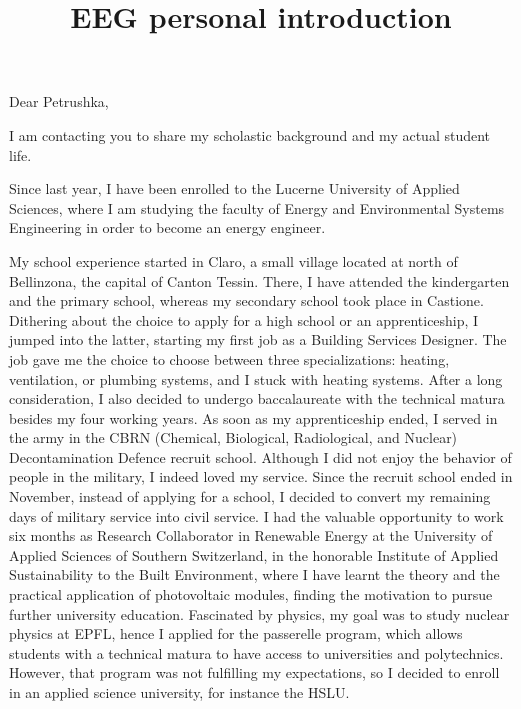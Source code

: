 \documentclass{article}
\title{\textbf{EEG personal introduction}}
\date{}
\begin{document}
\maketitle
\vspace*{-1.5cm}

Dear Petrushka,
\setlength{\parskip}{1.5em}

I am contacting you to share my scholastic background and my actual student life.
\setlength{\parskip}{.3em}

Since last year, I have been enrolled to the Lucerne University of Applied Sciences, where I
am studying the faculty of Energy and Environmental Systems Engineering in order to
become an energy engineer.
\setlength{\parskip}{1em}

My school experience started in Claro, a small village located at north of Bellinzona, the
capital of Canton Tessin. There, I have attended the kindergarten and the primary school,
whereas my secondary school took place in Castione.
Dithering about the choice to apply for a high school or an apprenticeship, I jumped into
the latter, starting my first job as a Building Services Designer. The job gave me the
choice to choose between three specializations: heating, ventilation, or plumbing systems,
and I stuck with heating systems. After a long consideration, I also decided to undergo
baccalaureate with the technical matura besides my four working years.
As soon as my apprenticeship ended, I served in the army in the CBRN
(Chemical, Biological, Radiological, and Nuclear) Decontamination Defence recruit school.
Although I did not enjoy the behavior of people in the military, I indeed loved my service.
Since the recruit school ended in November, instead of applying for a school, I decided to
convert my remaining days of military service into civil service.
I had the valuable opportunity to work six months as Research Collaborator in Renewable Energy
at the University of Applied Sciences of Southern Switzerland, in the honorable Institute
of Applied Sustainability to the Built Environment, where I have learnt the theory and the
practical application of photovoltaic modules, finding the motivation to pursue further
university education.
Fascinated by physics, my goal was to study nuclear physics at EPFL, hence I applied for
the passerelle program, which allows students with a technical matura to have access to
universities and polytechnics. However, that program was not fulfilling my expectations,
so I decided to enroll in an applied science university, for instance the HSLU.
\end{document}
